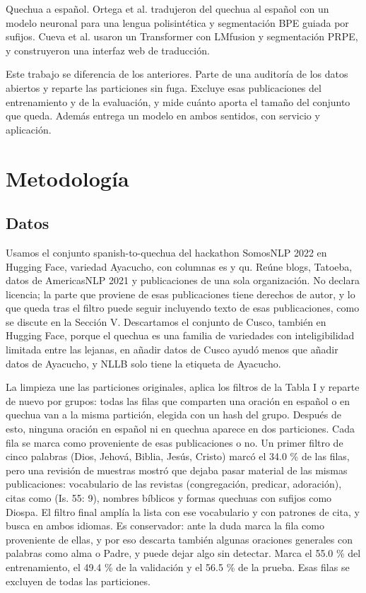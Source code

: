 \documentclass[conference]{IEEEtran}
\begin{document}
Quechua a español. Ortega et al. \cite{r10} tradujeron del quechua al español con un modelo neuronal para una lengua polisintética y segmentación BPE guiada por sufijos. Cueva et al. \cite{r9} usaron un Transformer con LMfusion y segmentación PRPE, y construyeron una interfaz web de traducción.

Este trabajo se diferencia de los anteriores. Parte de una auditoría de los datos abiertos y reparte las particiones sin fuga. Excluye esas publicaciones del entrenamiento y de la evaluación, y mide cuánto aporta el tamaño del conjunto que queda. Además entrega un modelo en ambos sentidos, con servicio y aplicación.

\section{Metodología}
\subsection{Datos}
Usamos el conjunto spanish-to-quechua del hackathon SomosNLP 2022 en Hugging Face, variedad Ayacucho, con columnas es y qu. Reúne blogs, Tatoeba, datos de AmericasNLP 2021 y publicaciones de una sola organización. No declara licencia; la parte que proviene de esas publicaciones tiene derechos de autor, y lo que queda tras el filtro puede seguir incluyendo texto de esas publicaciones, como se discute en la Sección V. Descartamos el conjunto de Cusco, también en Hugging Face, porque el quechua es una familia de variedades con inteligibilidad limitada entre las lejanas, en \cite{r4} añadir datos de Cusco ayudó menos que añadir datos de Ayacucho, y NLLB solo tiene la etiqueta de Ayacucho.

La limpieza une las particiones originales, aplica los filtros de la Tabla I y reparte de nuevo por grupos: todas las filas que comparten una oración en español o en quechua van a la misma partición, elegida con un hash del grupo. Después de esto, ninguna oración en español ni en quechua aparece en dos particiones. Cada fila se marca como proveniente de esas publicaciones o no. Un primer filtro de cinco palabras (Dios, Jehová, Biblia, Jesús, Cristo) marcó el 34.0 \% de las filas, pero una revisión de muestras mostró que dejaba pasar material de las mismas publicaciones: vocabulario de las revistas (congregación, predicar, adoración), citas como (Is. 55: 9), nombres bíblicos y formas quechuas con sufijos como Diospa. El filtro final amplía la lista con ese vocabulario y con patrones de cita, y busca en ambos idiomas. Es conservador: ante la duda marca la fila como proveniente de ellas, y por eso descarta también algunas oraciones generales con palabras como alma o Padre, y puede dejar algo sin detectar. Marca el 55.0 \% del entrenamiento, el 49.4 \% de la validación y el 56.5 \% de la prueba. Esas filas se excluyen de todas las particiones.
\end{document}

